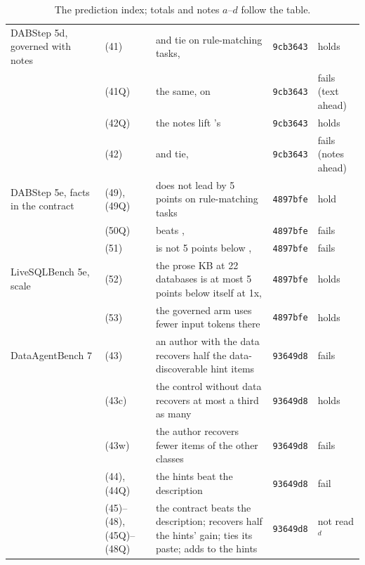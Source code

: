 \begin{table}[t]
\begin{tabular}{@{}L{2.7cm}L{1.5cm}L{9.0cm}ll@{}}
DABStep 5d, governed with notes & (41) & \armCws{} and \armTws{} tie on rule-matching tasks, \mLuna{} & \texttt{9cb3643} & holds \\
 & (41Q) & the same, on \mQwen{} & \texttt{9cb3643} & fails (text ahead) \\
 & (42Q) & the notes lift \mQwen{}'s \armC{} & \texttt{9cb3643} & holds \\
 & (42) & \armCws{} and \armC{} tie, \mLuna{} & \texttt{9cb3643} & fails (notes ahead) \\
\midrule
DABStep 5e, facts in the contract & (49), (49Q) & \armCp{} does not lead \armTp{} by 5 points on rule-matching tasks & \texttt{4897bfe} & hold \\
 & (50Q) & \armCp{} beats \armC{}, \mQwen{} & \texttt{4897bfe} & fails \\
 & (51) & \armMws{} is not 5 points below \armC{}, \mLuna{} & \texttt{4897bfe} & fails \\
LiveSQLBench 5e, scale & (52) & the prose KB at 22 databases is at most 5 points below itself at 1x, \mQwen{} & \texttt{4897bfe} & holds \\
 & (53) & the governed arm uses fewer input tokens there & \texttt{4897bfe} & holds \\
\midrule
DataAgentBench 7 & (43) & an author with the data recovers half the data-discoverable hint items & \texttt{93649d8} & fails \\
 & (43c) & the control without data recovers at most a third as many & \texttt{93649d8} & holds \\
 & (43w) & the author recovers fewer items of the other classes & \texttt{93649d8} & fails \\
 & (44), (44Q) & the hints beat the description & \texttt{93649d8} & fail \\
 & (45)--(48), (45Q)--(48Q) & the contract beats the description; recovers half the hints' gain; ties its paste; adds to the hints & \texttt{93649d8} & not read$^d$ \\
\bottomrule
\end{tabular}
\caption{The prediction index; totals and notes $a$--$d$ follow the table.}
\label{tab:predictions}
\end{table}

